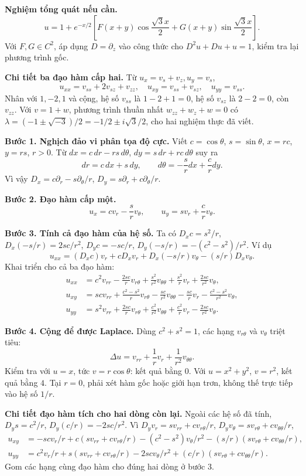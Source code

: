 \textbf{Nghiệm tổng quát nếu cần.}
\[u=1+e^{-x/2}\left[F(x+y)\cos\frac{\sqrt3x}{2}+G(x+y)\sin\frac{\sqrt3x}{2}\right].\]
Với $F,G\in C^2$, áp dụng $D=\partial_z$ vào công thức cho $D^2u+Du+u=1$, kiểm tra lại phương trình gốc.

\textbf{Chi tiết ba đạo hàm cấp hai.} Từ $u_x=v_s+v_z,u_y=v_s$,
\[u_{xx}=v_{ss}+2v_{sz}+v_{zz},\quad u_{xy}=v_{ss}+v_{sz},\quad u_{yy}=v_{ss}.\]
Nhân với $1,-2,1$ và cộng, hệ số $v_{ss}$ là $1-2+1=0$, hệ số $v_{sz}$ là $2-2=0$, còn $v_{zz}$. Với $v=1+w$, phương trình thuần nhất $w_{zz}+w_z+w=0$ có $\lambda=(-1\pm\sqrt{-3})/2=-1/2\pm i\sqrt3/2$, cho hai nghiệm thực đã viết.

\textbf{Bước 1. Nghịch đảo vi phân tọa độ cực.} Viết $c=\cos\theta$, $s=\sin\theta$, $x=rc$, $y=rs$, $r>0$. Từ $dx=c\,dr-rs\,d\theta$, $dy=s\,dr+rc\,d\theta$ suy ra
\[dr=c\,dx+s\,dy,\qquad d\theta=-\frac{s}{r}dx+\frac{c}{r}dy.\]
Vì vậy $D_x=c\partial_r-s\partial_\theta/r$, $D_y=s\partial_r+c\partial_\theta/r$.

\textbf{Bước 2. Đạo hàm cấp một.}
\[u_x=cv_r-\frac{s}{r}v_\theta,\qquad u_y=sv_r+\frac{c}{r}v_\theta.\]

\textbf{Bước 3. Tính cả đạo hàm của hệ số.} Ta có $D_xc=s^2/r$, $D_x(-s/r)=2sc/r^2$, $D_yc=-sc/r$, $D_y(-s/r)=-(c^2-s^2)/r^2$. Ví dụ
\[u_{xx}=(D_xc)v_r+cD_xv_r+D_x(-s/r)v_\theta-(s/r)D_xv_\theta.\]
Khai triển cho cả ba đạo hàm:
\begin{align*}
u_{xx}&=c^2v_{rr}-\frac{2sc}{r}v_{r\theta}+\frac{s^2}{r^2}v_{\theta\theta}
+\frac{s^2}{r}v_r+\frac{2sc}{r^2}v_\theta,\\
u_{xy}&=scv_{rr}+\frac{c^2-s^2}{r}v_{r\theta}-\frac{sc}{r^2}v_{\theta\theta}
-\frac{sc}{r}v_r-\frac{c^2-s^2}{r^2}v_\theta,\\
u_{yy}&=s^2v_{rr}+\frac{2sc}{r}v_{r\theta}+\frac{c^2}{r^2}v_{\theta\theta}
+\frac{c^2}{r}v_r-\frac{2sc}{r^2}v_\theta.
\end{align*}

\textbf{Bước 4. Cộng để được Laplace.} Dùng $c^2+s^2=1$, các hạng $v_{r\theta}$ và $v_\theta$ triệt tiêu:
\[\boxed{\Delta u=v_{rr}+\frac1r v_r+\frac1{r^2}v_{\theta\theta}.}\]
Kiểm tra với $u=x$, tức $v=r\cos\theta$: kết quả bằng $0$. Với $u=x^2+y^2$, $v=r^2$, kết quả bằng $4$. Tại $r=0$, phải xét hàm gốc hoặc giới hạn trơn, không thế trực tiếp vào hệ số $1/r$.

\textbf{Chi tiết đạo hàm tích cho hai dòng còn lại.} Ngoài các hệ số đã tính, $D_ys=c^2/r$, $D_y(c/r)=-2sc/r^2$. Vì $D_yv_r=sv_{rr}+cv_{r\theta}/r$, $D_yv_\theta=sv_{r\theta}+cv_{\theta\theta}/r$,
\[\begin{aligned}
u_{xy}&=-scv_r/r+c(sv_{rr}+cv_{r\theta}/r)
-(c^2-s^2)v_\theta/r^2-(s/r)(sv_{r\theta}+cv_{\theta\theta}/r),\\
u_{yy}&=c^2v_r/r+s(sv_{rr}+cv_{r\theta}/r)
-2scv_\theta/r^2+(c/r)(sv_{r\theta}+cv_{\theta\theta}/r).
\end{aligned}\]
Gom các hạng cùng đạo hàm cho đúng hai dòng ở bước 3.

